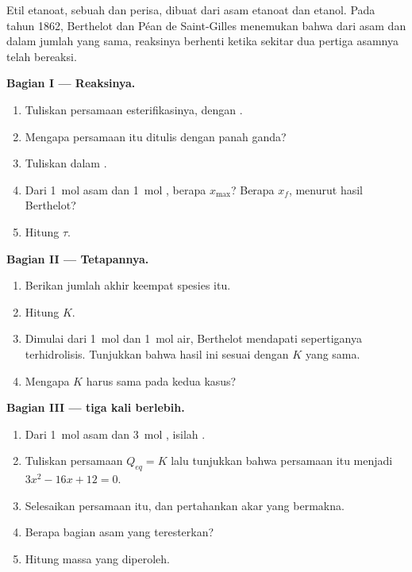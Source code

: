 \begin{problem}
\label{pb:g12:equilibrium:1}
Etil etanoat, sebuah  dan perisa, dibuat dari asam etanoat dan
etanol. Pada tahun 1862, Berthelot dan Péan de Saint-Gilles menemukan
bahwa dari asam dan  dalam jumlah yang sama, reaksinya berhenti
ketika sekitar dua pertiga asamnya telah bereaksi.

\medskip
\noindent\textbf{Bagian I --- Reaksinya.}
\begin{enumerate}
  \item Tuliskan persamaan esterifikasinya, dengan .
  \item Mengapa persamaan itu ditulis dengan panah ganda?
  \item Tuliskan  dalam .
  \item Dari \qty{1}{mol} asam dan \qty{1}{mol} , berapa
        $x_{\max}$? Berapa $x_f$, menurut hasil Berthelot?
  \item Hitung $\tau$.
\end{enumerate}

\medskip
\noindent\textbf{Bagian II --- Tetapannya.}
\begin{enumerate}[resume]
  \item Berikan jumlah akhir keempat spesies itu.
  \item Hitung $K$.
  \item Dimulai dari \qty{1}{mol}  dan \qty{1}{mol} air, Berthelot
        mendapati sepertiganya terhidrolisis. Tunjukkan bahwa hasil ini
        sesuai dengan $K$ yang sama.
  \item Mengapa $K$ harus sama pada kedua kasus?
\end{enumerate}

\medskip
\noindent\textbf{Bagian III ---  tiga kali berlebih.}
\begin{enumerate}[resume]
  \item Dari \qty{1}{mol} asam dan \qty{3}{mol} , isilah .
  \item Tuliskan persamaan $Q_{eq} = K$ lalu tunjukkan bahwa persamaan
        itu menjadi $3x^2 - 16x + 12 = 0$.
  \item Selesaikan persamaan itu, dan pertahankan akar yang bermakna.
  \item Berapa bagian asam yang teresterkan?
  \item Hitung massa  yang diperoleh.
\end{enumerate}


\end{problem}
